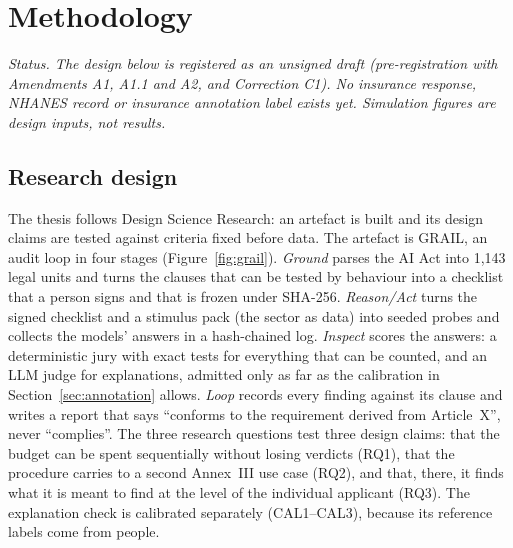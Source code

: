 \chapter{Methodology}
\label{ch:method}

\usetikzlibrary{arrows.meta}

\noindent\emph{Status. The design below is registered as an unsigned draft (pre-registration with Amendments A1, A1.1 and A2, and Correction C1). No insurance response, NHANES record or insurance annotation label exists yet. Simulation figures are design inputs, not results.}

\section{Research design}
\label{sec:design}
The thesis follows Design Science Research: an artefact is built and its design claims are tested against criteria fixed before data. The artefact is GRAIL, an audit loop in four stages (Figure~\ref{fig:grail}). \emph{Ground} parses the AI Act into 1{,}143 legal units and turns the clauses that can be tested by behaviour into a checklist that a person signs and that is frozen under SHA-256. \emph{Reason/Act} turns the signed checklist and a stimulus pack (the sector as data) into seeded probes and collects the models' answers in a hash-chained log. \emph{Inspect} scores the answers: a deterministic jury with exact tests for everything that can be counted, and an LLM judge for explanations, admitted only as far as the calibration in Section~\ref{sec:annotation} allows. \emph{Loop} records every finding against its clause and writes a report that says ``conforms to the requirement derived from Article~X'', never ``complies''. The three research questions test three design claims: that the budget can be spent sequentially without losing verdicts (RQ1), that the procedure carries to a second Annex~III use case (RQ2), and that, there, it finds what it is meant to find at the level of the individual applicant (RQ3). The explanation check is calibrated separately (CAL1--CAL3), because its reference labels come from people.

